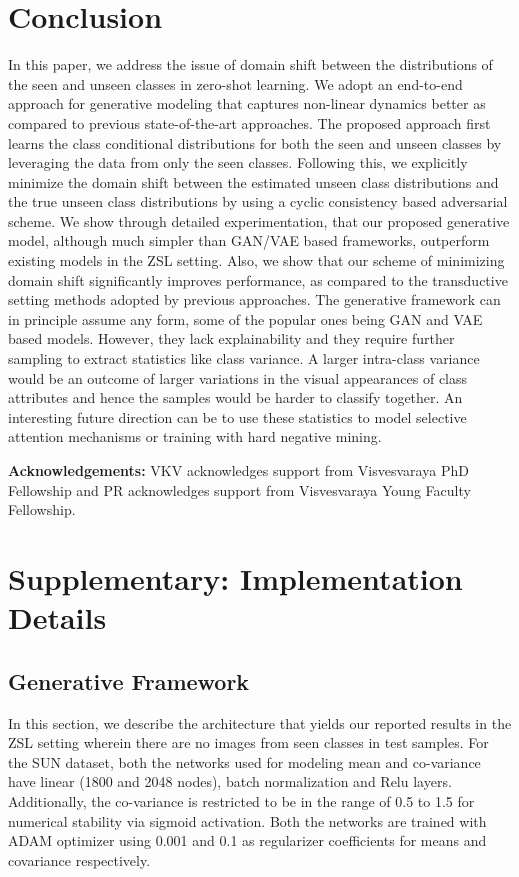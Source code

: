 \documentclass[10pt,twocolumn,letterpaper]{article}
\begin{document}
\section{Conclusion}
In this paper, we address the issue of domain shift between the distributions of the seen and unseen classes in zero-shot learning. We adopt an end-to-end approach for generative modeling that captures non-linear dynamics better as compared to previous state-of-the-art approaches. The proposed approach first learns the class conditional distributions for both the seen and unseen classes by leveraging the data from only the seen classes. Following this, we explicitly minimize the domain shift between the estimated unseen class distributions and the true unseen class distributions by using a cyclic consistency based adversarial scheme. We show through detailed experimentation, that our proposed generative model, although much simpler than GAN/VAE based frameworks, outperform existing models in the ZSL setting. Also, we show that our scheme of minimizing domain shift significantly improves performance, as compared to the transductive setting methods adopted by previous approaches. The generative framework can in principle assume any form, some of the popular ones being GAN and VAE based models. However, they lack explainability and they require further sampling to extract statistics like class variance. A larger intra-class variance would be an outcome of larger variations in the visual appearances of class attributes and hence the samples would be harder to classify together. An interesting future direction can be to use these statistics to model selective attention mechanisms or training with hard negative mining.

\textbf{Acknowledgements:} VKV acknowledges support from Visvesvaraya PhD Fellowship and PR acknowledges support from Visvesvaraya Young Faculty Fellowship.



{\small


}

\clearpage
\newpage
\appendix

\section{Supplementary: Implementation Details}
\subsection{Generative Framework}
In this section, we describe the architecture that yields our reported results in the ZSL setting wherein there are no images from seen classes in test samples. For the SUN dataset, both the networks used for modeling mean and co-variance have linear (1800 and 2048 nodes), batch normalization and Relu layers. Additionally, the co-variance is restricted to be in the range of 0.5 to 1.5 for numerical stability via sigmoid activation. Both the networks are trained with ADAM optimizer \cite{kingma2014adam} using 0.001 and 0.1 as regularizer coefficients for means and covariance respectively.
\end{document}
